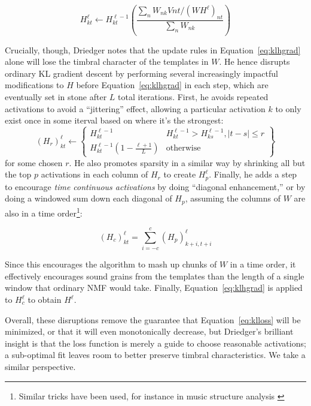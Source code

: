 \documentclass{article}
\begin{document}
\begin{equation}
\label{eq:klhgrad}
H_{kt}^{\ell} \gets H_{kt}^{\ell-1} \left( \frac{ \sum_{n} W_{nk} V{nt} / (WH^{\ell})_{nt} }{ \sum_{n} W_{nk} } \right)
\end{equation}

Crucially, though, Driedger notes that the update rules in Equation~\ref{eq:klhgrad} alone will lose the timbral character of the templates in $W$.  He hence disrupts ordinary KL gradient descent by performing several increasingly impactful modifications to $H$ before Equation~\ref{eq:klhgrad} in each step, which are eventually set in stone after $L$ total iterations.  First, he avoids repeated activations to avoid a ``jittering'' effect, allowing a particular activation $k$ to only exist once in some iterval based on where it's the strongest:
\begin{equation}
    (H_r)_{kt}^{\ell} \gets \left\{ \begin{array}{cc} H^{\ell-1}_{kt} & H^{\ell-1}_{kt} > H^{\ell-1}_{ks}, |t - s| \leq r \\ H^{\ell-1}_{kt} (1 - \frac{\ell+1}{L}) & \text{otherwise}  \end{array} \right\}
\end{equation}
for some chosen $r$.  He also promotes sparsity in a similar way by shrinking all but the top $p$ activations in each column of $H_r$ to create $H_p^{\ell}$.  Finally, he adds a step to encourage {\em time continuous activations} by doing ``diagonal enhancement,'' or by doing a windowed sum down each diagonal of $H_p$, assuming the columns of $W$ are also in a time order\footnote{Similar tricks have been used, for instance in music structure analysis \cite{mcfee2014analyzing}}:

\begin{equation}
(H_c)_{kt}^{\ell} = \sum_{i=-c}^c (H_p)^{\ell}_{k+i, t+i}
\end{equation}

Since this encourages the algorithm to mash up chunks of $W$ in a time order, it effectively encourages sound grains from the templates than the length of a single window that ordinary NMF would take.  Finally, Equation~\ref{eq:klhgrad} is applied to $H_c^{\ell}$ to obtain $H^{\ell}$.

Overall, these disruptions remove the guarantee that Equation~\ref{eq:klloss} will be minimized, or that it will even monotonically decrease, but Driedger's brilliant insight is that the loss function is merely a guide to choose reasonable activations; a sub-optimal fit leaves room to better preserve timbral characteristics.  We take a similar perspective.
\end{document}
